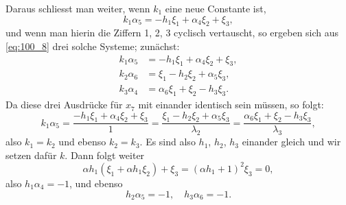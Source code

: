 \documentclass[12pt,a4paper]{article}
\theoremstyle{plain}
\theoremstyle{definition}
\theoremstyle{remark}
\begin{document}
Daraus schliesst man weiter, wenn $k_1$ eine neue Constante ist,
\begin{equation}\label{eq:100_13}
k_1 \alpha_5 = -h_1 \xi_1 + \alpha_4 \xi_2 + \xi_3,
\end{equation}
und wenn man hierin die Ziffern 1, 2, 3 cyclisch vertauscht, so
ergeben sich aus \eqref{eq:100_8} drei solche Systeme; zunächst:
\begin{equation*}\label{eq:100_14}
\begin{aligned}
k_1 \alpha_5 &= -h_1 \xi_1 + \alpha_4 \xi_2 + \xi_3, \\
k_2 \alpha_6 &= \xi_1 - h_2 \xi_2 + \alpha_5 \xi_3, \\
k_3 \alpha_4 &= \alpha_6 \xi_1 + \xi_2 - h_3 \xi_3.
\end{aligned}
\end{equation*}
Da diese drei Ausdrücke für $x_7$ mit einander identisch sein
müssen, so folgt:
\begin{equation}\label{eq:100_15}
k_1 \alpha_5 = \frac{-h_1 \xi_1 + \alpha_4 \xi_2 + \xi_3}{1} = \frac{\xi_1 - h_2 \xi_2 + \alpha_5 \xi_3}{\lambda_2} = \frac{\alpha_6 \xi_1 + \xi_2 - h_3 \xi_3}{\lambda_3},
\end{equation}
also $k_1 = k_2$ und ebenso $k_2 = k_3$. Es sind also $h_1$, $h_2$, $h_3$ einander
gleich und wir setzen dafür $k$. Dann folgt weiter
\begin{equation*}
\alpha h_1(\xi_1 + \alpha h_1 \xi_2) + \xi_3 = (\alpha h_1 + 1)^2 \xi_3 = 0,
\end{equation*}
also $h_1 \alpha_4 = -1$, und ebenso
\begin{equation*}
h_2 \alpha_5 = -1, \quad h_3 \alpha_6 = -1.
\end{equation*}
\end{document}
